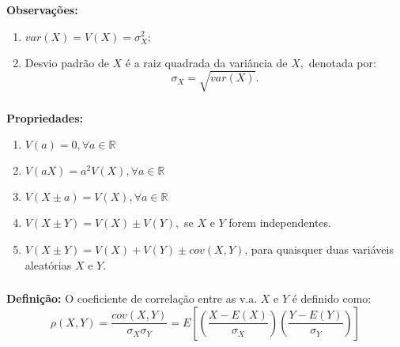 \documentclass[14pt,aspectratio=1610]{beamer}
\begin{document}
\begin{frame}{}
\frametitle{}
\begin{block}{}
\justifying
\textbf{Observações:} 
\begin{enumerate}
\item $var(X)=V(X)=\sigma_{X}^{2};$\pause

\item Desvio padrão de $X$ é a raiz quadrada da variância de $X,$ denotada por: $$\sigma_{X}=\sqrt{var(X)}.$$

\end{enumerate}

\end{block}
\end{frame}

\begin{frame}{}
\frametitle{}
\begin{block}{}
\justifying
\textbf{Propriedades:}

\begin{enumerate}
\item $V(a)=0,\forall a\in \mathbb{R}$\pause
\item $V(aX)=a^{2}V(X),\forall a\in \mathbb{R}$\pause
\item $V(X\pm a)=V(X), \forall a\in \mathbb{R}$\pause
\item $V(X\pm Y)=V(X) \pm V(Y),$ se $X$ e $Y$ forem independentes.\pause
\item $V(X\pm Y)=V(X) + V(Y) \pm cov(X,Y)$, para quaisquer duas variáveis aleatórias $X$ e $Y.$
\end{enumerate}
\end{block}
\end{frame}

\begin{frame}{}
\frametitle{}
\begin{block}{}
\justifying
\textbf{Definição:} O coeficiente de correlação entre as v.a. $X$ e $Y$ é definido como: 
$$\rho(X,Y)=\dfrac{cov(X,Y)}{\sigma_{X}\sigma_{Y}}=E\left[\left(\dfrac{X-E(X)}{\sigma_{X}}\right)\left(\dfrac{Y-E(Y)}{\sigma_{Y}}\right)\right]$$
\end{block}
\end{frame}
\end{document}
